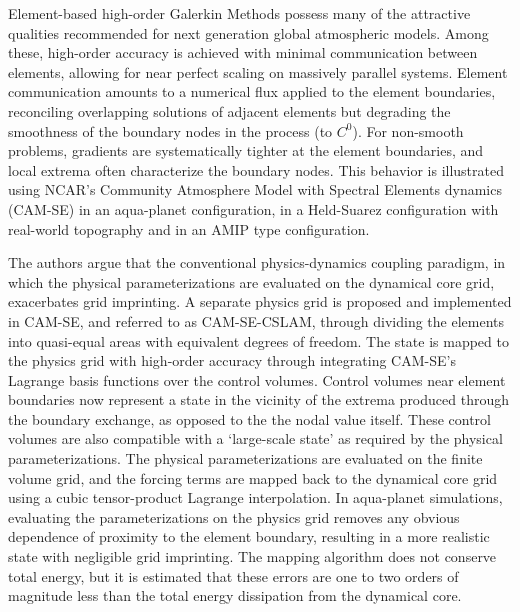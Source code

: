 \documentclass[twocol]{ametsoc}
\begin{document}
Element-based high-order Galerkin Methods possess many of the attractive qualities recommended for next generation global atmospheric models. Among these, high-order accuracy is achieved with minimal communication between elements, allowing for near perfect scaling on massively parallel systems. Element communication amounts to a numerical flux applied to the element boundaries, reconciling overlapping solutions of adjacent elements but degrading the smoothness of the boundary nodes in the process (to $C^0$). For non-smooth problems, gradients are systematically tighter at the element boundaries, and local extrema often characterize the boundary nodes. This behavior is illustrated using NCAR's Community Atmosphere Model with Spectral Elements dynamics (CAM-SE) in an aqua-planet configuration, in a Held-Suarez configuration with real-world topography {\color{red}and in an AMIP type configuration.}

The authors argue that the conventional physics-dynamics coupling paradigm, in which the physical parameterizations are evaluated on the dynamical core grid, exacerbates grid imprinting. A separate physics grid is proposed and implemented in CAM-SE, and referred to as CAM-SE-CSLAM, through dividing the elements into quasi-equal areas with equivalent degrees of freedom. The state is mapped to the physics grid with high-order accuracy through integrating CAM-SE's Lagrange basis functions over the control volumes. Control volumes near element boundaries now represent a state in the vicinity of the extrema produced through the boundary exchange, as opposed to the the nodal value itself. These control volumes are also compatible with a `large-scale state' as required by the physical parameterizations. The physical parameterizations are evaluated on the finite volume grid, and the forcing terms are mapped back to the dynamical core grid using a cubic tensor-product Lagrange interpolation. In aqua-planet simulations, evaluating the parameterizations on the physics grid removes any obvious dependence of proximity to the element boundary, resulting in a more realistic state with negligible grid imprinting. The mapping algorithm does not conserve total energy, but it is estimated that these errors are one to two orders of magnitude less than the total energy dissipation from the dynamical core.
\end{document}
